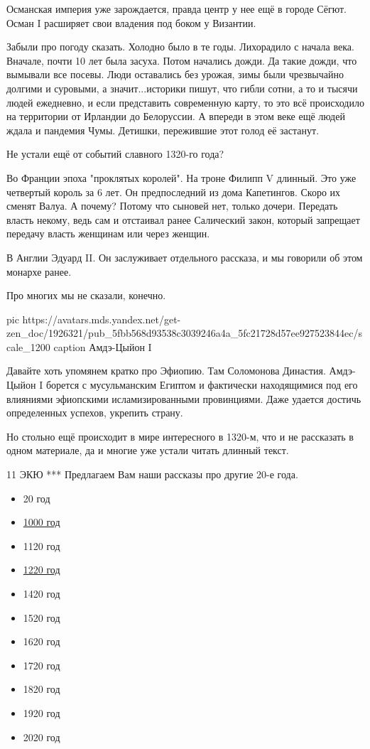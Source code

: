 Османская империя уже зарождается, правда центр у нее ещё в городе Сёгют. Осман
I расширяет свои владения под боком у Византии.

Забыли про погоду сказать. Холодно было в те годы. Лихорадило с начала века.
Вначале, почти 10 лет была засуха. Потом начались дожди. Да такие дожди, что
вымывали все посевы. Люди оставались без урожая, зимы были чрезвычайно долгими
и суровыми, а значит...историки пишут, что гибли сотни, а то и тысячи людей
ежедневно, и если представить современную карту, то это всё происходило на
территории от Ирландии до Белоруссии. А впереди в этом веке ещё людей ждала и
пандемия Чумы. Детишки, пережившие этот голод её застанут.

Не устали ещё от событий славного 1320-го года?

Во Франции эпоха "проклятых королей". На троне Филипп V длинный. Это уже
четвертый король за 6 лет. Он предпоследний из дома Капетингов. Скоро их сменят
Валуа. А почему? Потому что сыновей нет, только дочери. Передать власть некому,
ведь сам и отстаивал ранее Салический закон, который запрещает передачу власть
женщинам или через женщин.

В Англии Эдуард II. Он заслуживает отдельного рассказа, и мы говорили об этом
монархе ранее.

Про многих мы не сказали, конечно. 

\ifcmt
pic https://avatars.mds.yandex.net/get-zen_doc/1926321/pub_5fbb568d93538c3039246a4a_5fc21728d57ee927523844ec/scale_1200
caption Амдэ-Цыйон I
\fi

Давайте хоть упомянем кратко про Эфиопию. Там Соломонова Династия. Амдэ-Цыйон I
борется с мусульманским Египтом и фактически находящимися под его влияниями
эфиопскими исламизированными провинциями. Даже удается достичь определенных
успехов, укрепить страну.

Но стольно ещё происходит в мире интересного в 1320-м, что и не рассказать в
одном материале, да и многие уже устали читать длинный текст. 

11 ЭКЮ
***
Предлагаем Вам наши рассказы про другие 20-е года.
\begin{itemize}
  \item 20 год
  \item \href{https://zen.yandex.ru/media/11ecu/1000i-god-rus-i-mir-5f3a41d44f2e4f5b77ddee5e?utm_source=yandex.zen&utm_medium=article&utm_campaign=5f8012d35dbc67260c3d0961}{1000 год}
  \item 1120 год
  \item \href{https://zen.yandex.ru/media/11ecu/eto-byl-1220i-ili-800-let-tomu-nazad-5f4b516711a7d1138b0d7c80?integration=morda_zen_lib&place=export}{1220 год}
  \item 1420 год
  \item 1520 год
  \item 1620 год
  \item 1720 год
  \item 1820 год
  \item 1920 год
  \item 2020 год
\end{itemize}
